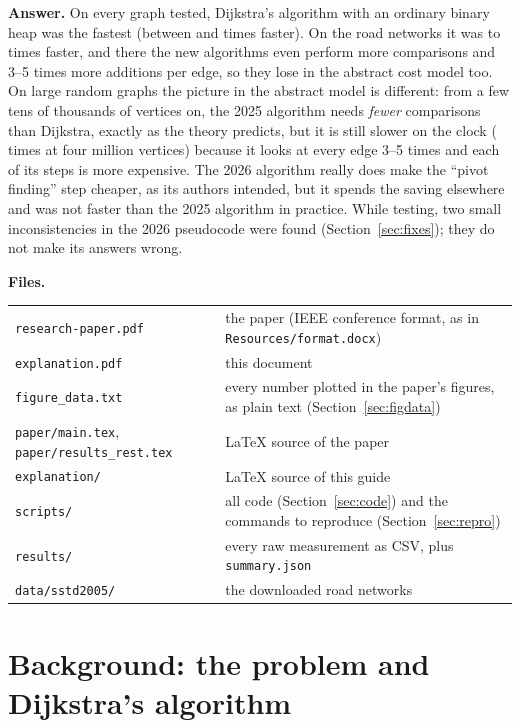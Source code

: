 \documentclass[11pt,a4paper]{article}
\newcommand{\code}[1]{\texttt{#1}}
\begin{document}
\textbf{Answer.} On every graph tested, Dijkstra's algorithm with an ordinary binary heap was the fastest (between \AllRatioMin{} and \AllRatioMax{} times faster). On the road networks it was \RealRatioMin{} to \RealRatioMax{} times faster, and there the new algorithms even perform more comparisons and 3--5 times more additions per edge, so they lose in the abstract cost model too. On large random graphs the picture in the abstract model is different: from a few tens of thousands of vertices on, the 2025 algorithm needs \emph{fewer} comparisons than Dijkstra, exactly as the theory predicts, but it is still slower on the clock (\ScaleRandTwoFiveLast{} times at four million vertices) because it looks at every edge 3--5 times and each of its steps is more expensive. The 2026 algorithm really does make the ``pivot finding'' step cheaper, as its authors intended, but it spends the saving elsewhere and was not faster than the 2025 algorithm in practice. While testing, two small inconsistencies in the 2026 pseudocode were found (Section~\ref{sec:fixes}); they do not make its answers wrong.

\textbf{Files.}
\begin{center}
\begin{tabular}{@{}p{5.2cm}p{9.8cm}@{}}
\toprule
\code{research-paper.pdf} & the paper (IEEE conference format, as in \code{Resources/format.docx})\\
\code{explanation.pdf} & this document\\
\code{figure\_data.txt} & every number plotted in the paper's figures, as plain text (Section~\ref{sec:figdata})\\
\code{paper/main.tex}, \code{paper/results\_rest.tex} & LaTeX source of the paper\\
\code{explanation/} & LaTeX source of this guide\\
\code{scripts/} & all code (Section~\ref{sec:code}) and the commands to reproduce (Section~\ref{sec:repro})\\
\code{results/} & every raw measurement as CSV, plus \code{summary.json}\\
\code{data/sstd2005/} & the downloaded road networks\\
\bottomrule
\end{tabular}
\end{center}

\section{Background: the problem and Dijkstra's algorithm}
\end{document}
